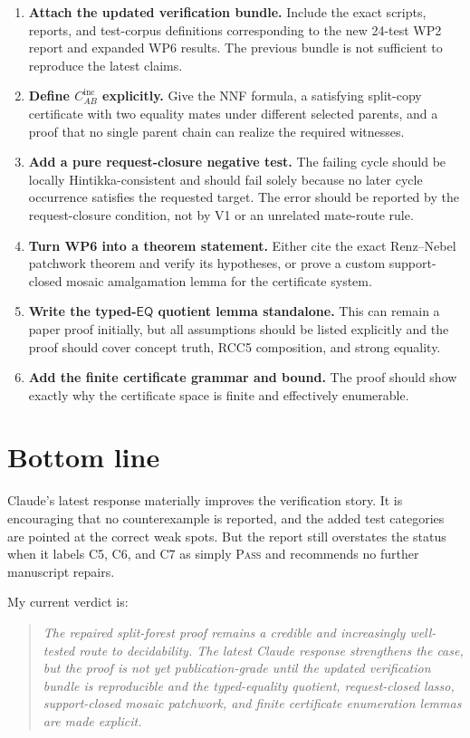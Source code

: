 \documentclass[11pt]{article}
\newcommand{\EQ}{\mathsf{EQ}}
\newcommand{\PASS}{\textsc{Pass}}
\begin{document}
\begin{enumerate}[leftmargin=2em]
  \item \textbf{Attach the updated verification bundle.}  Include the exact
  scripts, reports, and test-corpus definitions corresponding to the new 24-test
  WP2 report and expanded WP6 results.  The previous bundle is not sufficient to
  reproduce the latest claims.

  \item \textbf{Define \(C_{AB}^{\mathrm{inc}}\) explicitly.}  Give the NNF
  formula, a satisfying split-copy certificate with two equality mates under
  different selected parents, and a proof that no single parent chain can realize
  the required witnesses.

  \item \textbf{Add a pure request-closure negative test.}  The failing cycle
  should be locally Hintikka-consistent and should fail solely because no later
  cycle occurrence satisfies the requested target.  The error should be reported
  by the request-closure condition, not by V1 or an unrelated mate-route rule.

  \item \textbf{Turn WP6 into a theorem statement.}  Either cite the exact
  Renz--Nebel patchwork theorem and verify its hypotheses, or prove a custom
  support-closed mosaic amalgamation lemma for the certificate system.

  \item \textbf{Write the typed-\(\EQ\) quotient lemma standalone.}  This can
  remain a paper proof initially, but all assumptions should be listed explicitly
  and the proof should cover concept truth, RCC5 composition, and strong equality.

  \item \textbf{Add the finite certificate grammar and bound.}  The proof should
  show exactly why the certificate space is finite and effectively enumerable.
\end{enumerate}

\section{Bottom line}

Claude's latest response materially improves the verification story.  It is
encouraging that no counterexample is reported, and the added test categories
are pointed at the correct weak spots.  But the report still overstates the
status when it labels C5, C6, and C7 as simply \PASS{} and recommends no further
manuscript repairs.

My current verdict is:
\begin{quote}
\emph{The repaired split-forest proof remains a credible and increasingly
well-tested route to decidability.  The latest Claude response strengthens the
case, but the proof is not yet publication-grade until the updated verification
bundle is reproducible and the typed-equality quotient, request-closed lasso,
support-closed mosaic patchwork, and finite certificate enumeration lemmas are
made explicit.}
\end{quote}
\end{document}
